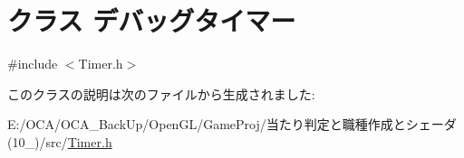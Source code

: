 \hypertarget{class_xE3_x83_x87_xE3_x83_x90_xE3_x83_x83_xE3_x82_xB0_xE3_x82_xBF_xE3_x82_xA4_xE3_x83_x9E_xE3_x83_xBC}{\section{クラス デバッグタイマー}
\label{class_xE3_x83_x87_xE3_x83_x90_xE3_x83_x83_xE3_x82_xB0_xE3_x82_xBF_xE3_x82_xA4_xE3_x83_x9E_xE3_x83_xBC}
}


{\ttfamily \#include $<$Timer.\-h$>$}



このクラスの説明は次のファイルから生成されました\-:\begin{DoxyCompactItemize}
\item 
E\-:/\-O\-C\-A/\-O\-C\-A\-\_\-\-Back\-Up/\-Open\-G\-L/\-Game\-Proj/当たり判定と職種作成とシェーダ(10\-\_)/src/\hyperlink{_timer_8h}{Timer.\-h}\end{DoxyCompactItemize}
